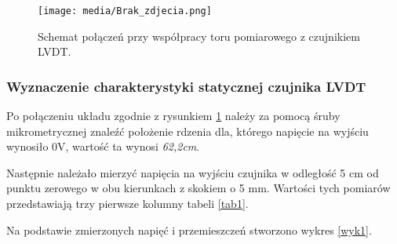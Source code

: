 \documentclass{article}
\begin{document}
\vspace{1em}
\begin{figure}[ht]
    \centering
    \texttt{[image: media/Brak\_zdjecia.png]}
    \caption{Schemat połączeń przy współpracy toru pomiarowego z czujnikiem LVDT.}
    \label{fig1}
\end{figure}
\newpage

\subsubsection{Wyznaczenie charakterystyki statycznej czujnika LVDT} \label{1a}
Po połączeniu układu zgodnie z rysunkiem \ref{fig1} należy za pomocą śruby mikrometrycznej znaleźć położenie rdzenia dla, którego napięcie na wyjściu wynosiło 0V, wartość ta wynosi \textit{62,2cm}. 



Następnie należało mierzyć napięcia na wyjściu czujnika w odległość 5 cm od punktu zerowego w obu kierunkach z skokiem o 5 mm. Wartości tych pomiarów przedstawiają trzy pierwsze kolumny tabeli \ref{tab1}.

Na podstawie zmierzonych napięć i przemieszczeń stworzono wykres \ref{wyk1}.
\end{document}
